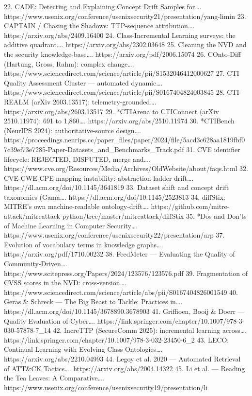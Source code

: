 \documentclass[11pt,a4paper]{article}
\begin{document}
22. CADE: Detecting and Explaining Concept Drift Samples for…. https://www.usenix.org/conference/usenixsecurity21/presentation/yang-limin
23. CAPTAIN / Chasing the Shadows: TTP-sequence attribution…. https://arxiv.org/abs/2409.16400
24. Class-Incremental Learning surveys: the additive quadrant…. https://arxiv.org/abs/2302.03648
25. Cleaning the NVD and the security knowledge-base…. https://arxiv.org/pdf/2006.15074
26. COnto-Diff (Hartung, Gross, Rahm): complex change…. https://www.sciencedirect.com/science/article/pii/S1532046412000627
27. CTI Quality Assessment Cluster — automated dynamic…. https://www.sciencedirect.com/science/article/pii/S0167404824003845
28. CTI-REALM (arXiv 2603.13517): telemetry-grounded…. https://arxiv.org/abs/2603.13517
29. *CTIArena to CTIConnect (arXiv 2510.11974): 691 to 1,860…. https://arxiv.org/abs/2510.11974
30. *CTIBench (NeurIPS 2024): authoritative-source design…. https://proceedings.neurips.cc/paper\_files/paper/2024/file/5acd3c628aa1819fbf07c39ef73e7285-Paper-Datasets\_and\_Benchmarks\_Track.pdf
31. CVE identifier lifecycle: REJECTED, DISPUTED, merge and…. https://www.cve.org/Resources/Media/Archives/OldWebsite/about/faqs.html
32. CVE-CWE-CPE mapping instability: abstraction-ladder drift…. https://dl.acm.org/doi/10.1145/3641819
33. Dataset shift and concept drift taxonomies (Gama…. https://dl.acm.org/doi/10.1145/2523813
34. diffStix: MITRE's own machine-readable ontology-drift…. https://github.com/mitre-attack/mitreattack-python/tree/master/mitreattack/diffStix
35. *Dos and Don'ts of Machine Learning in Computer Security…. https://www.usenix.org/conference/usenixsecurity22/presentation/arp
37. Evolution of vocabulary terms in knowledge graphs…. https://arxiv.org/pdf/1710.00232
38. FeedMeter — Evaluating the Quality of Community-Driven…. https://www.scitepress.org/Papers/2024/123576/123576.pdf
39. Fragmentation of CVSS scores in the NVD: cross-version…. https://www.sciencedirect.com/science/article/abs/pii/S0167404826001549
40. Geras \& Schreck — The Big Beast to Tackle: Practices in…. https://dl.acm.org/doi/10.1145/3678890.3678903
41. Griffioen, Booij \& Doerr — Quality Evaluation of Cyber…. https://link.springer.com/chapter/10.1007/978-3-030-57878-7\_14
42. IncreTTP (SecureComm 2025): incremental learning across…. https://link.springer.com/chapter/10.1007/978-3-032-23450-6\_2
43. LECO: Continual Learning with Evolving Class Ontologies…. https://arxiv.org/abs/2210.04993
44. Legoy et al. 2020 — Automated Retrieval of ATT\&CK Tactics…. https://arxiv.org/abs/2004.14322
45. Li et al. — Reading the Tea Leaves: A Comparative…. https://www.usenix.org/conference/usenixsecurity19/presentation/li
\end{document}
